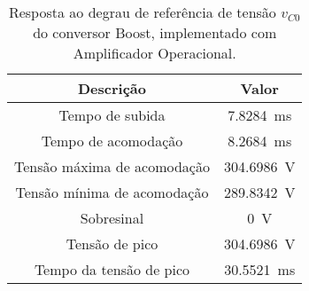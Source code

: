 \begin{table}[!ht]
\centering
\caption{Resposta ao degrau de referência de tensão $v_{C0}$ do conversor Boost, implementado com Amplificador Operacional.}
\label{tab:parametros}
\begin{tabular}{@{}cc@{}}
\toprule
\textbf{Descrição} & \textbf{Valor}\\ \midrule
Tempo de subida & \SI{7.8284}{\milli\s}\\
Tempo de acomodação & \SI{8.2684}{\milli\s}\\
Tensão máxima de acomodação & \SI{304.6986}{\V}\\
Tensão mínima de acomodação & \SI{289.8342}{\V}\\
Sobresinal & \SI{0}{\V}\\
Tensão de pico & \SI{304.6986}{\V}\\
Tempo da tensão de pico & \SI{30.5521}{\milli\s}\\
\bottomrule
\end{tabular}
\end{table}

